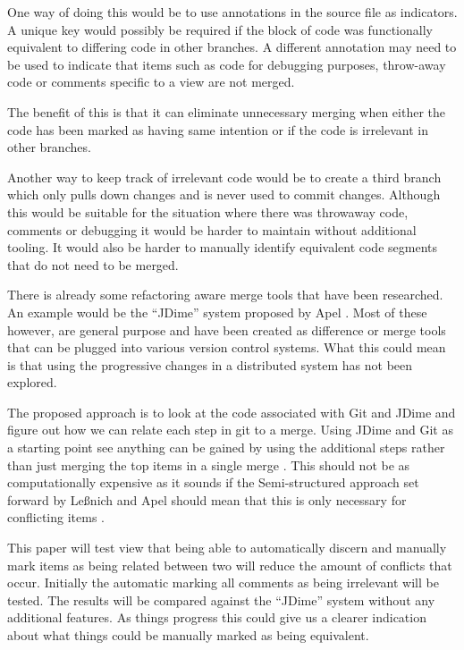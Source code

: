 \documentclass[12pt]{CRPITStyle}
\renewcommand{\cite}{\citep}
\begin{document}
One way of doing this would be to use annotations in the source file as indicators. A unique key would possibly be required if the block of code was functionally equivalent to differing code in other branches. A different annotation may need to be used to indicate that items such as code for debugging purposes, throw-away code or comments specific to a view are not merged.

The benefit of this is that it can eliminate unnecessary merging when either the code has been marked as having same intention or if the code is irrelevant in other branches. 

Another way to keep track of irrelevant code would be to create a third branch which only pulls down changes and is never used to commit changes. Although this would be suitable for the situation where there was throwaway code, comments or debugging it would be harder to maintain without additional tooling. It would also be harder to manually identify equivalent code segments that do not need to be merged. 

There is already some refactoring aware merge tools that have been researched. An example would be the ``JDime'' system proposed by Apel \cite{Apel2011}. Most of these however, are general purpose and have been created as difference or merge tools that can be plugged into various version control systems. What this could mean is that using the progressive changes in a distributed system has not been explored. 

The proposed approach is to look at the code associated with Git and JDime and figure out how we can relate each step in git to a merge. Using JDime and Git as a starting point see anything can be gained by using the additional steps rather than just merging the top items in a single merge . This should not be as computationally expensive as it sounds if the Semi-structured approach set forward by Le{\ss}nich and Apel should mean that this is only necessary for conflicting items \cite{LeBenich2012} \cite{Apel2011}. 

This paper will test view that being able to automatically discern and manually mark items as being related between two will reduce the amount of conflicts that occur. Initially the automatic marking all comments as being irrelevant will be tested. The results will be compared against the ``JDime'' system without any additional features. As things progress this could give us a clearer indication about what things could be manually marked as being equivalent. 
\end{document}
